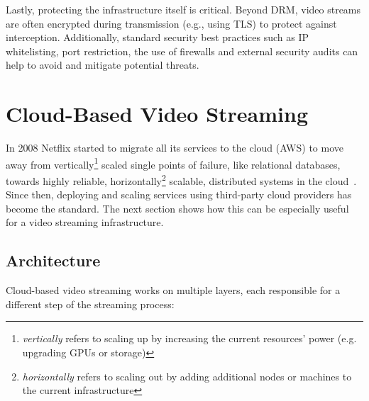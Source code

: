 Lastly, protecting the infrastructure itself is critical. Beyond DRM, video streams are often encrypted during transmission (e.g., using \ac{TLS}) to protect against interception. Additionally, standard security best practices such as IP whitelisting, port restriction, the use of firewalls and external security audits can help to avoid and mitigate potential threats.

\section{Cloud-Based Video Streaming}

In 2008 Netflix started to migrate all its services to the cloud (\ac{AWS}) to move away from vertically\footnote{\textit{vertically} refers to scaling up by increasing the current resources' power (e.g. upgrading GPUs or storage)} scaled single points of failure, like relational databases, towards highly reliable, horizontally\footnote{\textit{horizontally} refers to scaling out by adding additional nodes or machines to the current infrastructure} scalable, distributed systems in the cloud~\parencite{netflix_aws}. Since then, deploying and scaling services using third-party cloud providers has become the standard. The next section shows how this can be especially useful for a video streaming infrastructure. 

\subsection{Architecture}
Cloud-based video streaming works on multiple layers, each responsible for a different step of the streaming process:

